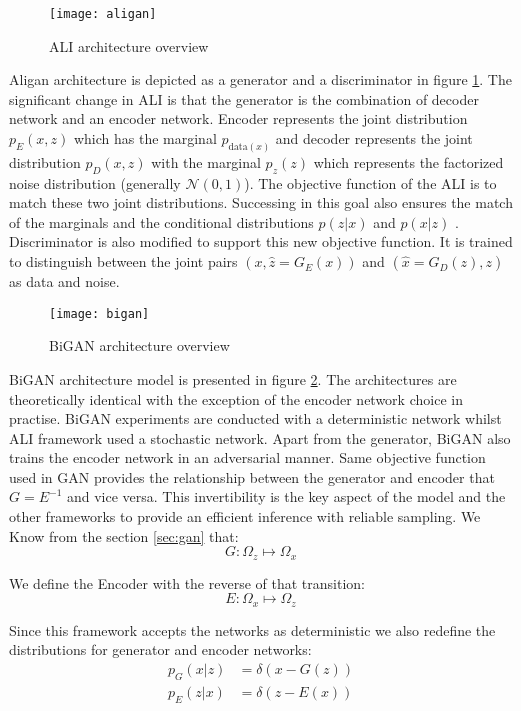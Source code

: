 \begin{figure}[h!]
	\centering
	\texttt{[image: aligan]}
    \caption{ALI architecture overview}
    \label{fig:aligan_model}
\end{figure}

Aligan architecture is depicted as a generator and a discriminator in figure \ref{fig:aligan_model}.
The significant change in ALI is that the generator is the combination of decoder network and an
encoder network. Encoder represents the joint distribution $p_{E}(x, z)$ which has the marginal
$p_{\text{data}(x)}$ and decoder represents the joint distribution $p_{D}(x, z)$ with the marginal
$p_z(z)$ which represents the factorized noise distribution (generally $\mathcal{N}(0, 1)$). The
objective function of the ALI is to match these two joint distributions. Successing in this goal
also ensures the match of the marginals and the conditional distributions $p(z | x)$ and $p(x | z)$
. Discriminator is also modified to support this new objective function. It is trained to
distinguish between the joint pairs  $(x, \hat{z} = G_{E}(x))$ and $(\hat{x} = G_{D}(z), z)$ as data
and noise.

\begin{figure}[h!]
	\centering
	\texttt{[image: bigan]}
    \caption{BiGAN architecture overview}
    \label{fig:bigan_model}
\end{figure}

BiGAN architecture model is presented in figure \ref{fig:bigan_model}. The architectures are
theoretically identical with the exception of the encoder network choice in practise. BiGAN
experiments are conducted with a deterministic network whilst ALI framework used a stochastic
network. Apart from the generator, BiGAN also trains the encoder network in an adversarial manner.
Same objective function used in GAN provides the relationship between the generator and encoder that
$G = E^{-1}$ and vice versa. This invertibility is the key aspect of the model and the other
frameworks to provide an efficient inference with reliable sampling. We Know from the section
\ref{sec:gan} that: 
$$
G : \Omega_{z} \mapsto \Omega_{x}
$$

We define the Encoder with the reverse of that transition:
$$
E : \Omega_{x} \mapsto \Omega_{z}
$$

Since this framework accepts the networks as deterministic we also redefine the distributions for
generator and encoder networks:
\begin{align*}
    p_G(x | z) & = \delta (x - G(z)) \\
    p_E(z | x) & = \delta (z - E(x))
\end{align*}

